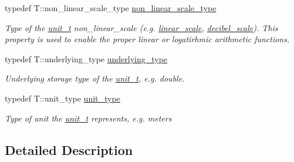 \begin{DoxyCompactItemize}
\item 
\hypertarget{structunits_1_1traits_1_1unit__t__traits_a123dc73f52c3200a4eeec30b550be096}{}typedef T\+::non\+\_\+linear\+\_\+scale\+\_\+type \hyperlink{structunits_1_1traits_1_1unit__t__traits_a123dc73f52c3200a4eeec30b550be096}{non\+\_\+linear\+\_\+scale\+\_\+type}\label{structunits_1_1traits_1_1unit__t__traits_a123dc73f52c3200a4eeec30b550be096}

\begin{DoxyCompactList}\small\item\em Type of the \hyperlink{classunits_1_1unit__t}{unit\+\_\+t} non\+\_\+linear\+\_\+scale (e.\+g. \hyperlink{structunits_1_1linear__scale}{linear\+\_\+scale}, \hyperlink{structunits_1_1decibel__scale}{decibel\+\_\+scale}). This property is used to enable the proper linear or logatirhmic arithmetic functions. \end{DoxyCompactList}\item 
\hypertarget{structunits_1_1traits_1_1unit__t__traits_a67f44ead54d0f792f094a1e6eddbe51c}{}typedef T\+::underlying\+\_\+type \hyperlink{structunits_1_1traits_1_1unit__t__traits_a67f44ead54d0f792f094a1e6eddbe51c}{underlying\+\_\+type}\label{structunits_1_1traits_1_1unit__t__traits_a67f44ead54d0f792f094a1e6eddbe51c}

\begin{DoxyCompactList}\small\item\em Underlying storage type of the {\ttfamily \hyperlink{classunits_1_1unit__t}{unit\+\_\+t}}, e.\+g. {\ttfamily double}. \end{DoxyCompactList}\item 
\hypertarget{structunits_1_1traits_1_1unit__t__traits_a6de485677a031bd6051b8d4cbcfd38fb}{}typedef T\+::unit\+\_\+type \hyperlink{structunits_1_1traits_1_1unit__t__traits_a6de485677a031bd6051b8d4cbcfd38fb}{unit\+\_\+type}\label{structunits_1_1traits_1_1unit__t__traits_a6de485677a031bd6051b8d4cbcfd38fb}

\begin{DoxyCompactList}\small\item\em Type of unit the {\ttfamily \hyperlink{classunits_1_1unit__t}{unit\+\_\+t}} represents, e.\+g. {\ttfamily meters} \end{DoxyCompactList}\end{DoxyCompactItemize}


\subsection{Detailed Description}
